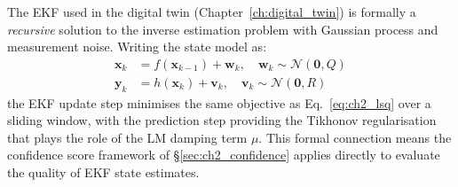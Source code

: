 The EKF used in the digital twin (Chapter~\ref{ch:digital_twin}) is
formally a \emph{recursive} solution to the inverse estimation problem
with Gaussian process and measurement noise. Writing the state model as:
\begin{align}
  \mathbf{x}_k &= f(\mathbf{x}_{k-1}) + \mathbf{w}_k, \quad
    \mathbf{w}_k \sim \mathcal{N}(\mathbf{0}, Q) \\
  \mathbf{y}_k &= h(\mathbf{x}_k) + \mathbf{v}_k, \quad
    \mathbf{v}_k \sim \mathcal{N}(\mathbf{0}, R)
\end{align}
the EKF update step minimises the same objective as
Eq.~\eqref{eq:ch2_lsq} over a sliding window, with the prediction
step providing the Tikhonov regularisation that plays the role of the
LM damping term $\mu$. This formal connection means the confidence
score framework of \S\ref{sec:ch2_confidence} applies directly to
evaluate the quality of EKF state estimates.
